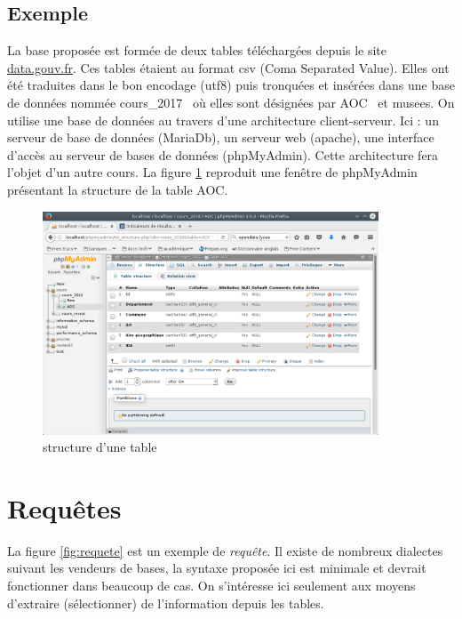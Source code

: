 \subsection{Exemple}
La base proposée est formée de deux tables téléchargées depuis le site \href{http://www.data.gouv.fr}{data.gouv.fr}.
Ces tables étaient au format csv (Coma Separated Value). Elles ont été traduites dans le bon encodage (utf8) puis tronquées et insérées dans une base de données nommée \og cours\_2017\fg~ où elles sont désignées par \og AOC\fg~ et \og musees\fg. \newline
On utilise une base de données au travers d'une architecture client-serveur. Ici : un serveur de base de données (MariaDb), un serveur web (apache), une interface d'accès au serveur de bases de données (phpMyAdmin). Cette architecture fera l'objet d'un autre cours.\newline
La figure \ref{fig:aoc} reproduit une fenêtre de phpMyAdmin présentant la structure de la table \og AOC\fg.
\begin{figure}[h]
  \centering
  \includegraphics[width=10cm]{./introbdd_aoc.png}
  \caption{structure d'une table}
  \label{fig:aoc}
\end{figure}


\section{Requêtes}
La figure \ref{fig:requete} est un exemple de \emph{requête}. Il existe de nombreux dialectes suivant les vendeurs de bases, la syntaxe proposée ici est minimale et devrait fonctionner dans beaucoup de cas. 
On s'intéresse ici seulement aux moyens d'extraire (sélectionner) de l'information depuis les tables.
